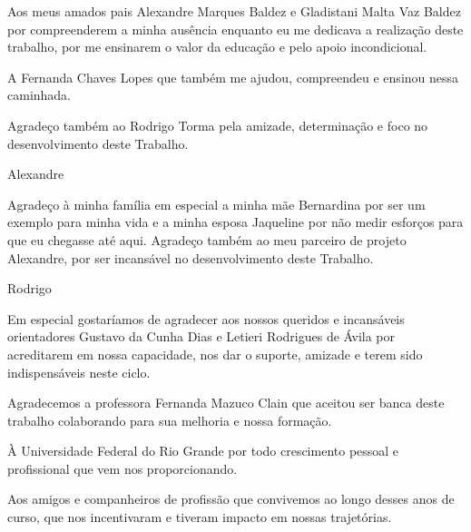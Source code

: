 Aos meus amados pais Alexandre Marques Baldez e Gladistani Malta Vaz Baldez por compreenderem a minha ausência enquanto eu me dedicava a realização deste trabalho, por me ensinarem o valor da educação e pelo apoio incondicional.

A Fernanda Chaves Lopes que também me ajudou, compreendeu e ensinou nessa caminhada.

Agradeço também ao Rodrigo Torma pela amizade, determinação e foco no desenvolvimento deste Trabalho.

\begin{flushright}Alexandre\end{flushright}

Agradeço à minha família em especial a minha mãe Bernardina por ser um exemplo para minha vida e a minha esposa Jaqueline por não medir esforços para que eu chegasse até aqui. Agradeço também ao meu parceiro de projeto Alexandre, por ser incansável no desenvolvimento deste Trabalho.

\begin{flushright}Rodrigo\end{flushright}
    
Em especial gostaríamos de agradecer aos nossos queridos e incansáveis orientadores Gustavo da Cunha Dias e Letieri Rodrigues de Ávila por acreditarem em nossa capacidade, nos dar o suporte, amizade e terem sido indispensáveis neste ciclo.

Agradecemos a professora Fernanda Mazuco Clain que aceitou ser banca deste trabalho colaborando para sua melhoria e nossa formação.

À Universidade Federal do Rio Grande por todo crescimento pessoal e profissional que vem nos proporcionando.

Aos amigos e companheiros de profissão que convivemos ao longo desses anos de curso, que nos incentivaram e tiveram impacto em nossas trajetórias.
